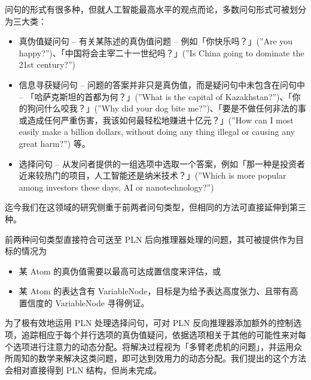 问句的形式有很多种，但就人工智能最高水平的观点而论，多数问句形式可被划分为三大类：

\begin{itemize}
\item 真伪值疑问句 – 有关某陈述的真伪值问题 – 例如「你快乐吗？」(”Are you happy?”)、「中国将会主宰二十一世纪吗？」(”Is China going to dominate the 21st century?”)
\item 信息寻获疑问句 – 问题的答案并非只是真伪值，而是疑问句中未包含在问句中 – 「哈萨克斯坦的首都为何？」(”What is the capital of Kazakhstan?”)、「你的狗问什么咬我？」(”Why did your dog bite me?”)、「要是不做任何非法的事或造成任何严重伤害，我该如何最轻松地赚进十亿元？」(”How can I most easily make a billion dollars, without doing any thing illegal or causing any great harm?”) 等。
\item 选择问句 – 从发问者提供的一组选项中选取一个答案，例如「那一种是投资者近来较热门的项目，人工智能还是纳米技术？」(”Which is more popular among investors these days, AI or nanotechnology?”)
\end{itemize}

迄今我们在这领域的研究侧重于前两者问句类型，但相同的方法可直接延伸到第三种。

前两种问句类型直接符合可送至 PLN 后向推理器处理的问题，其可被提供作为目标的情况为

\begin{itemize}
\item 某 Atom 的真伪值需要以最高可达成置信度来评估，或
\item 某 Atom 的表达含有 VariableNode，目标是为给予表达高度张力、且带有高置信度的 VariableNode 寻得例证。 
\end{itemize}

为了极有效地运用 PLN 处理选择问句，可对 PLN 反向推理器添加额外的控制选项，追踪相应于每个并行选项的真伪值疑问，依据选项相关于其他的可能性来对每个选项进行注意力的动态分配。将解决过程视为「多臂老虎机的问题」，并运用众所周知的数学来解决这类问题，即可达到效用力的动态分配。我们提出的这个方法会相对直接得到 PLN 结构，但尚未完成。

